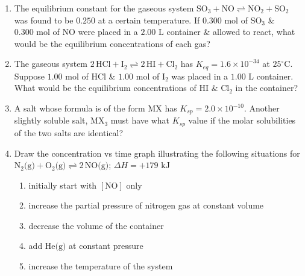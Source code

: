 \documentclass[12pt]{article}
\begin{document}
\begin{enumerate}[label=\arabic*.]
    \item The equilibrium constant for the gaseous system $\text{SO}_3 + \text{NO} \rightleftharpoons \text{NO}_2 + \text{SO}_2$ was found to be $0.250$ at a certain temperature. If $0.300\text{ mol}$ of $\text{SO}_3$ \& $0.300\text{ mol}$ of $\text{NO}$ were placed in a $2.00\text{ L}$ container \& allowed to react, what would be the equilibrium concentrations of each gas?
    \vspace{4.5cm}

    \item The gaseous system $2\,\text{HCl} + \text{I}_2 \rightleftharpoons 2\,\text{HI} + \text{Cl}_2$ has $K_{eq} = 1.6 \times 10^{-34}$ at $25^\circ\text{C}$. Suppose $1.00\text{ mol}$ of $\text{HCl}$ \& $1.00\text{ mol}$ of $\text{I}_2$ was placed in a $1.00\text{ L}$ container. What would be the equilibrium concentrations of $\text{HI}$ \& $\text{Cl}_2$ in the container?
    \vspace{4.5cm}

    \item A salt whose formula is of the form $\text{MX}$ has $K_{sp} = 2.0 \times 10^{-10}$. Another slightly soluble salt, $\text{MX}_3$ must have what $K_{sp}$ value if the molar solubilities of the two salts are identical?
    \vspace{4cm}

    \item Draw the concentration vs time graph illustrating the following situations for $\text{N}_2\text{(g)} + \text{O}_2\text{(g)} \rightleftharpoons 2\,\text{NO(g)}$; $\Delta H = +179\text{ kJ}$
    \begin{enumerate}[label=\alph*)]
        \item initially start with $[\text{NO}]$ only
        \vspace{1.5cm}
        \item increase the partial pressure of nitrogen gas at constant volume
        \vspace{1.5cm}
        \item decrease the volume of the container
        \vspace{1.5cm}
        \item add $\text{He(g)}$ at constant pressure
        \vspace{1.5cm}
        \item increase the temperature of the system
        \vspace{1.5cm}
    \end{enumerate}


\end{enumerate}
\end{document}

